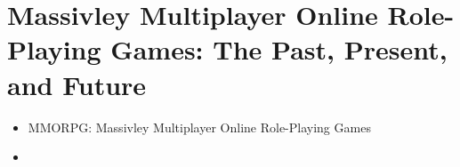 \chapter*{Massivley Multiplayer Online Role-Playing Games: The Past, Present, and Future}

  \begin{itemize}
    \item {\BF MMORPG:} Massivley Multiplayer Online Role-Playing Games
    \item 
  \end{itemize}